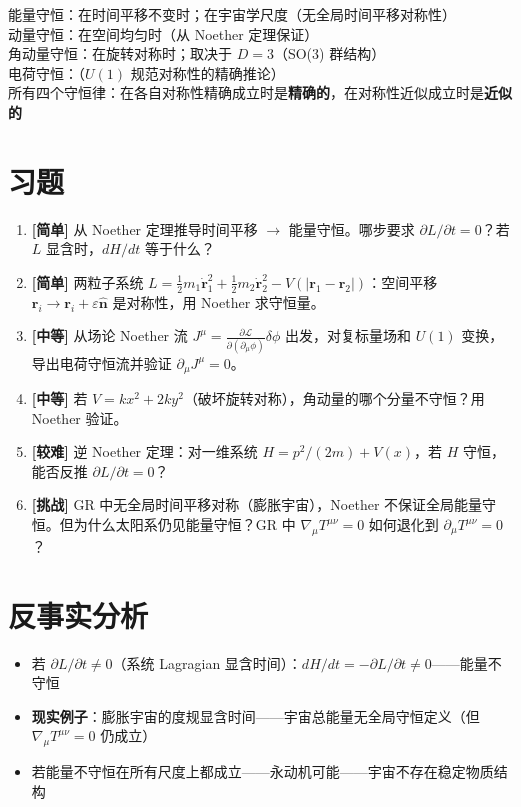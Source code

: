 \precisionbox[四大守恒律精度]
  能量守恒：\precexact 在时间平移不变时；\precisionapprox 在宇宙学尺度（无全局时间平移对称性）\\
  动量守恒：\precexact 在空间均匀时（从 Noether 定理保证）\\
  角动量守恒：\precexact 在旋转对称时；取决于 $D=3$（SO(3) 群结构）\\
  电荷守恒：\precexact（$U(1)$ 规范对称性的精确推论）\\
  所有四个守恒律：在各自对称性精确成立时是\textbf{精确的}，在对称性近似成立时是\textbf{近似的}
\endprecisionbox

\section*{习题}

\begin{enumerate}
  \item \textbf{[简单]} 从 Noether 定理推导时间平移 $\to$ 能量守恒。哪步要求 $\partial L/\partial t=0$？若 $L$ 显含时，$dH/dt$ 等于什么？
  \item \textbf{[简单]} 两粒子系统 $L=\frac{1}{2}m_1\dot{\mathbf{r}}_1^2+\frac{1}{2}m_2\dot{\mathbf{r}}_2^2 - V(|\mathbf{r}_1-\mathbf{r}_2|)$：空间平移 $\mathbf{r}_i\to\mathbf{r}_i+\varepsilon\hat{\mathbf{n}}$ 是对称性，用 Noether 求守恒量。
  \item \textbf{[中等]} 从场论 Noether 流 $J^\mu = \frac{\partial\mathcal{L}}{\partial(\partial_\mu\phi)}\delta\phi$ 出发，对复标量场和 $U(1)$ 变换，导出电荷守恒流并验证 $\partial_\mu J^\mu=0$。
  \item \textbf{[中等]} 若 $V=kx^2+2ky^2$（破坏旋转对称），角动量的哪个分量不守恒？用 Noether 验证。
  \item \textbf{[较难]} 逆 Noether 定理：对一维系统 $H=p^2/(2m)+V(x)$，若 $H$ 守恒，能否反推 $\partial L/\partial t=0$？
  \item \textbf{[挑战]} GR 中无全局时间平移对称（膨胀宇宙），Noether 不保证全局能量守恒。但为什么太阳系仍见能量守恒？GR 中 $\nabla_\mu T^{\mu\nu}=0$ 如何退化到 $\partial_\mu T^{\mu\nu}=0$？
\end{enumerate}

\section*{反事实分析}

\begin{limitbox}
  \begin{itemize}
    \item 若 $\partial L/\partial t \neq 0$（系统 Lagragian 显含时间）：$dH/dt = -\partial L/\partial t \neq 0$——能量不守恒
    \item \textbf{现实例子}：膨胀宇宙的度规显含时间——宇宙总能量无全局守恒定义（但 $\nabla_\mu T^{\mu\nu}=0$ 仍成立）
    \item 若能量不守恒在所有尺度上都成立——永动机可能——宇宙不存在稳定物质结构
  \end{itemize}
\end{limitbox}

